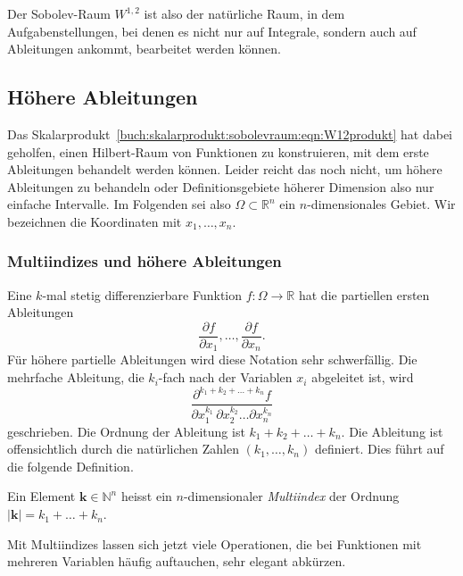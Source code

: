 Der Sobolev-Raum $W^{1,2}$ ist also der natürliche Raum, in dem
Aufgabenstellungen, bei denen es nicht nur auf Integrale, sondern
auch auf Ableitungen ankommt, bearbeitet werden können.

%
%
\subsection{Höhere Ableitungen}
Das Skalarprodukt~\eqref{buch:skalarprodukt:sobolevraum:eqn:W12produkt}
hat dabei geholfen, einen Hilbert-Raum von Funktionen zu konstruieren,
mit dem erste Ableitungen behandelt werden können.
Leider reicht das noch nicht, um höhere Ableitungen zu behandeln oder
Definitionsgebiete höherer Dimension also nur einfache Intervalle.
Im Folgenden sei also $\Omega\subset\mathbb{R}^n$ ein $n$-dimensionales
Gebiet.
Wir bezeichnen die Koordinaten mit $x_1,\dots,x_n$.

\subsubsection{Multiindizes und höhere Ableitungen}
Eine $k$-mal stetig differenzierbare Funktion $f\colon\Omega\to \mathbb{R}$ 
hat die partiellen ersten Ableitungen
\[
\frac{\partial f}{\partial x_1},
\dots,
\frac{\partial f}{\partial x_n}.
\]
Für höhere partielle Ableitungen wird diese Notation sehr schwerfällig.
Die mehrfache Ableitung, die $k_i$-fach nach der Variablen $x_i$ abgeleitet
ist, wird
\[
\frac{
\partial^{k_1+k_2+\dots+k_n} f
}{
\partial x_1^{k_1}\,\partial x_2^{k_2} \dots \partial x_n^{k_n}
}
\]
geschrieben.
Die Ordnung der Ableitung ist $k_1+k_2+\dots+k_n$.
Die Ableitung ist offensichtlich durch die natürlichen Zahlen
$(k_1,\dots,k_n)$ definiert.
Dies führt auf die folgende Definition.

\begin{definition}
Ein Element $\bm{k}\in \mathbb{N}^n$ heisst ein $n$-dimensionaler
{\em Multiindex} der Ordnung $|\bm{k}|= k_1+\dots+k_n$.
%
\end{definition}

Mit Multiindizes lassen sich jetzt viele Operationen, die bei
Funktionen mit mehreren Variablen häufig auftauchen, sehr elegant
abkürzen.

